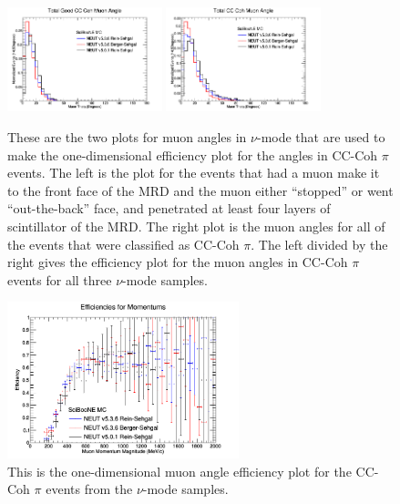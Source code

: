 \documentclass[11pt]{article}
\begin{document}
\begin{figure}[H]
\centering
\includegraphics[width=0.4\textwidth]{NMCombinedPlotsImages/14-NMCombinedPlots.png}
\includegraphics[width=0.4\textwidth]{NMCombinedPlotsImages/16-NMCombinedPlots.png}
\caption{These are the two plots for muon angles in $\nu$-mode that are used to make the one-dimensional efficiency plot for the angles in CC-Coh $\pi$ events. The left is the plot for the events that had a muon make it to the front face of the MRD and the muon either ``stopped'' or went ``out-the-back'' face, and penetrated at least four layers of scintillator of the MRD. The right plot is the muon angles for all of the events that were classified as CC-Coh $\pi$. The left divided by the right gives the efficiency plot for the muon angles in CC-Coh $\pi$ events for all three $\nu$-mode samples.}
\label{fig:app:NMCCCohMuonAng}
\end{figure}

\begin{figure}[H]
\centering
\includegraphics[width=0.6\textwidth]{NMCombinedPlotsImages/24-NMCombinedPlots.png}
\caption{This is the one-dimensional muon angle efficiency plot for the CC-Coh $\pi$ events from the $\nu$-mode samples.}
\label{fig:app:NMCCCohAng1DEff}
\end{figure}
\end{document}
